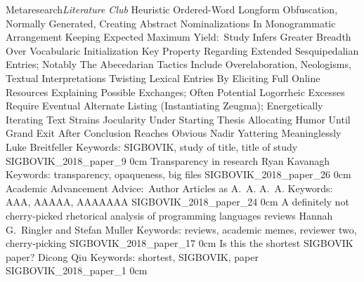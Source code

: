 \addtrack
	{Metaresearch}{\textit{Literature Club}}
\addpaper
	{Heuristic Ordered-Word Longform Obfuscation, Normally Generated, Creating Abstract
	Nominalizations In Monogrammatic Arrangement Keeping Expected Maximum Yield:\ Study Infers
	Greater Breadth Over Vocabularic Initialization Key Property Regarding Extended
	Sesquipedalian Entries; Notably The Abecedarian Tactics Include Overelaboration, Neologisms,
	Textual Interpretations Twisting Lexical Entries By Eliciting Full Online Resources
	Explaining Possible Exchanges; Often Potential Logorrheic Excesses Require Eventual
	Alternate Listing (Instantiating Zeugma); Energetically Iterating Text Strains Jocularity
	Under Starting Thesis Allocating Humor Until Grand Exit After Conclusion Reaches Obvious
	Nadir Yattering Meaninglessly}
	{Luke Breitfeller}
	{Keywords: SIGBOVIK, study of title, title of study}
	{SIGBOVIK_2018_paper_9}
	{0cm}
	{}
\addpaper
	{Transparency in research}
	{Ryan Kavanagh}
	{Keywords: transparency, opaqueness, big files}
	{SIGBOVIK_2018_paper_26}
	{0cm}
	{}
\addpaper
	{Academic Advancement Advice:\ Author Articles as A.\ A.}
	{A.\ A.}
	{Keywords: AAA, AAAAA, AAAAAAA}
	{SIGBOVIK_2018_paper_24}
	{0cm}
	{}
\addpaper
	{A definitely not cherry-picked rhetorical analysis of programming languages reviews}
	{Hannah G.\ Ringler and Stefan Muller}
	{Keywords: reviews, academic memes, reviewer two, cherry-picking}
	{SIGBOVIK_2018_paper_17}
	{0cm}
	{}
\addpaper
	{Is this the shortest SIGBOVIK paper?}
	{Dicong Qiu}
	{Keywords: shortest, SIGBOVIK, paper}
	{SIGBOVIK_2018_paper_1}
	{0cm}
	{}
